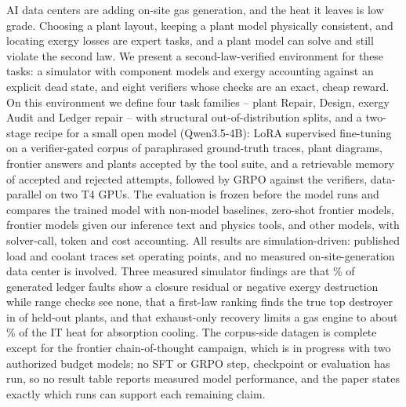 AI data centers are adding on-site gas generation, and the heat it leaves is low grade. Choosing a plant layout, keeping a plant model physically consistent, and locating exergy losses are expert tasks, and a plant model can solve and still violate the second law. We present a second-law-verified environment for these tasks: a simulator with  component models and exergy accounting against an explicit dead state, and eight verifiers whose checks are an exact, cheap reward. On this environment we define four task families -- plant Repair, Design, exergy Audit and Ledger repair -- with structural out-of-distribution splits, and a two-stage recipe for a small open model (Qwen3.5-4B): LoRA supervised fine-tuning on a verifier-gated corpus of paraphrased ground-truth traces,  plant diagrams, frontier answers and plants accepted by the tool suite, and a retrievable memory of accepted and rejected attempts, followed by GRPO against the verifiers, data-parallel on two T4 GPUs. The evaluation is frozen before the model runs and compares the trained model with non-model baselines, zero-shot frontier models, frontier models given our inference text and physics tools, and other models, with solver-call, token and cost accounting. All results are simulation-driven: published load and coolant traces set operating points, and no measured on-site-generation data center is involved. Three measured simulator findings are that \% of  generated ledger faults show a closure residual or negative exergy destruction while range checks see none, that a first-law ranking finds the true top destroyer in  of  held-out plants, and that exhaust-only recovery limits a gas engine to about \% of the IT heat for absorption cooling. The corpus-side datagen is complete except for the frontier chain-of-thought campaign, which is in progress with two authorized budget models; no SFT or GRPO step, checkpoint or evaluation has run, so no result table reports measured model performance, and the paper states exactly which runs can support each remaining claim.
